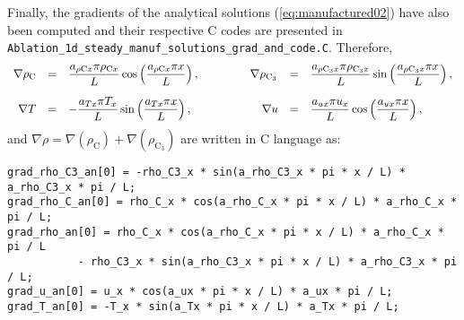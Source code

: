 \documentclass[10pt]{article}
\newcommand{\C}{\text{C}}
\begin{document}
Finally, the gradients of the analytical solutions (\ref{eq:manufactured02})  have also been computed and their respective C codes are presented in  \texttt{Ablation\_1d\_steady\_manuf\_solutions\_grad\_and\_code.C}. Therefore,
\begin{equation}
\begin{array}{rrlrl}
\nabla \rho_{\C} &=&  \dfrac{ a_{ \rho \C x} \pi \rho_{\C x} }{L} \cos\left( \dfrac{ a_{\rho \C x} \pi x }{L}\right),
\quad\quad\qquad\,\,
\nabla \rho_{\C_3} &=&  \dfrac{ a_{ \rho \C_3 x} \pi \rho_{\C_3 x} }{L} \sin\left( \dfrac{ a_{ \rho \C_3 x} \pi x }{L}\right),\vspace{10pt}\\
%
\nabla T &=& - \dfrac{ a_{Tx}  \pi T_x  }{L} \sin\left(\dfrac{a_{Tx}  \pi  x }{L}\right),
\quad\quad\quad\quad\quad\quad
\nabla u &=& \dfrac{ a_{ux} \pi u_x}{L} \cos\left( \dfrac{ a_{ux} \pi x }{L}\right),
\end{array}
\end{equation}
and $\nabla \rho =\nabla \left( \rho_\text{C}\right) + \nabla \left(\rho_{\text{C}_3} \right)$  are written in C language as:
%
\begin{verbatim}
grad_rho_C3_an[0] = -rho_C3_x * sin(a_rho_C3_x * pi * x / L) * a_rho_C3_x * pi / L;
grad_rho_C_an[0] = rho_C_x * cos(a_rho_C_x * pi * x / L) * a_rho_C_x * pi / L;
grad_rho_an[0] = rho_C_x * cos(a_rho_C_x * pi * x / L) * a_rho_C_x * pi / L 
	       - rho_C3_x * sin(a_rho_C3_x * pi * x / L) * a_rho_C3_x * pi / L;
grad_u_an[0] = u_x * cos(a_ux * pi * x / L) * a_ux * pi / L;
grad_T_an[0] = -T_x * sin(a_Tx * pi * x / L) * a_Tx * pi / L;
\end{verbatim}



%
 

\end{document}
